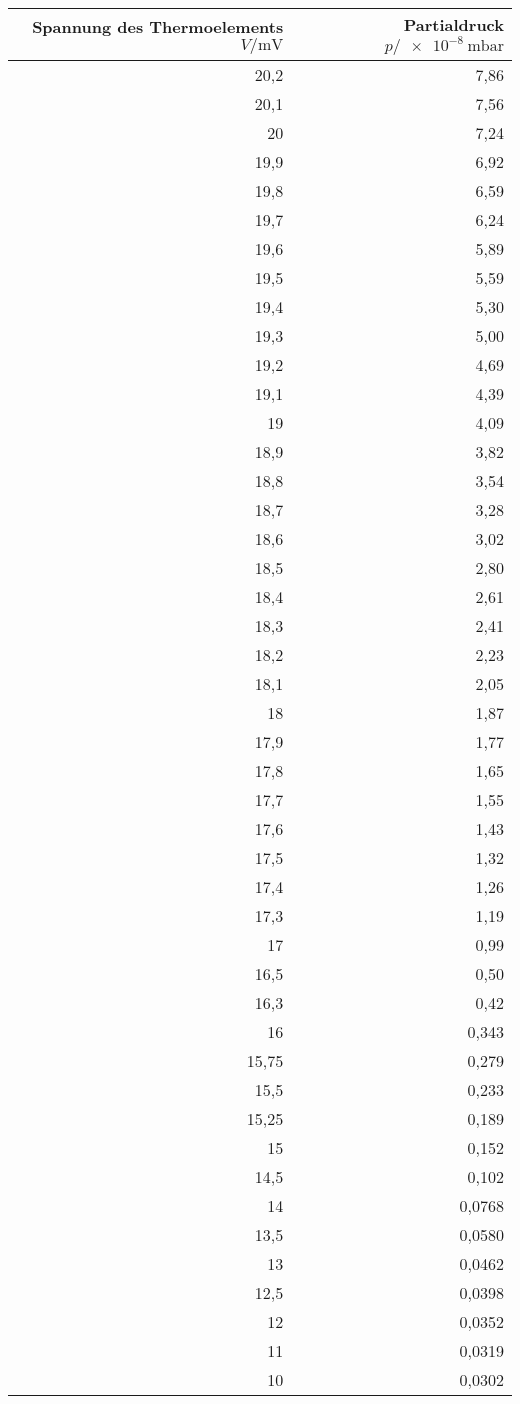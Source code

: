 \begin{tabular}{rr}
\toprule
Spannung des Thermoelements $V/\si{\milli\volt}$ & Partialdruck $p/\SI{e-8}{\milli\bar}$ \\
\midrule
20,2	& 7,86 \\
20,1	& 7,56\\
20	& 7,24\\
19,9	& 6,92\\
19,8	& 6,59\\
19,7	& 6,24\\
19,6	& 5,89\\
19,5	& 5,59\\
19,4	& 5,30\\
19,3	& 5,00\\
19,2	& 4,69\\
19,1	& 4,39\\
19	& 4,09\\
18,9	& 3,82\\
18,8	& 3,54\\
18,7	& 3,28\\
18,6	& 3,02\\
18,5	& 2,80\\
18,4	& 2,61\\
18,3	& 2,41\\
18,2	& 2,23\\
18,1	& 2,05\\
18	& 1,87\\
17,9	& 1,77\\
17,8	& 1,65\\
17,7	& 1,55\\
17,6	& 1,43\\
17,5	& 1,32\\
17,4	& 1,26\\
17,3	& 1,19\\
17	& 0,99\\
16,5	& 0,50\\
16,3	& 0,42\\
16	& 0,343\\
15,75	& 0,279\\
15,5	& 0,233\\
15,25	& 0,189\\
15	& 0,152\\
14,5	& 0,102\\
14	& 0,0768\\
13,5	& 0,0580\\
13	& 0,0462\\
12,5	& 0,0398\\
12	& 0,0352\\
11	& 0,0319\\
10	& 0,0302\\
\bottomrule
\end{tabular}
